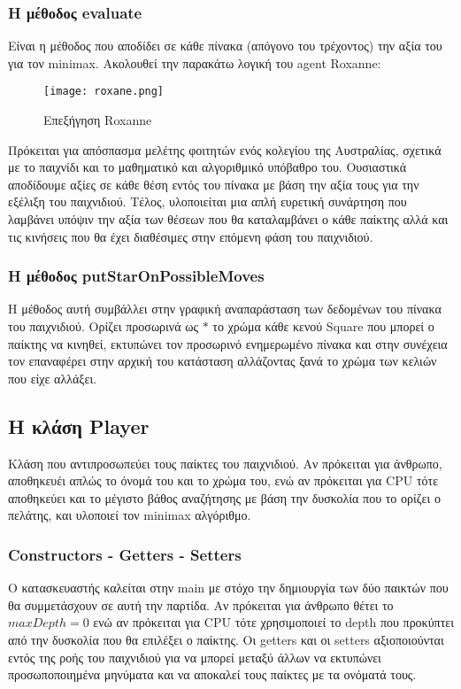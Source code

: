 \documentclass[12pt]{article}
\begin{document}
        \subsubsection{Η μέθοδος evaluate}
        Είναι η μέθοδος που αποδίδει σε κάθε πίνακα (απόγονο του τρέχοντος) την αξία του για τον minimax. Ακολουθεί την παρακάτω λογική του agent Roxanne:
        \begin{figure}[H]
            \centering
            \texttt{[image: roxane.png]}
            \caption{Επεξήγηση Roxanne}
        \end{figure}
        Πρόκειται για απόσπασμα μελέτης φοιτητών ενός κολεγίου της Αυστραλίας, σχετικά με το παιχνίδι και το μαθηματικό και αλγοριθμικό υπόβαθρο του. Ουσιαστικά αποδίδουμε αξίες σε κάθε θέση εντός του πίνακα με βάση την αξία τους για την εξέλιξη του παιχνιδιού. Τέλος, υλοποιείται μια απλή ευρετική συνάρτηση που λαμβάνει υπόψιν την αξία των θέσεων που θα καταλαμβάνει ο κάθε παίκτης αλλά και τις κινήσεις που θα έχει διαθέσιμες στην επόμενη φάση του παιχνιδιού. 
        \subsubsection{Η μέθοδος putStarOnPossibleMoves}
        Η μέθοδος αυτή συμβάλλει στην γραφική αναπαράσταση των δεδομένων του πίνακα του παιχνιδιού. Ορίζει προσωρινά ως $\ast$ το χρώμα κάθε κενού Square που μπορεί ο παίκτης να κινηθεί, εκτυπώνει τον προσωρινό ενημερωμένο πίνακα και στην συνέχεια τον επαναφέρει στην αρχική του κατάσταση αλλάζοντας ξανά το χρώμα των κελιών που είχε αλλάξει. 
    \subsection{Η κλάση Player}
    Κλάση που αντιπροσωπεύει τους παίκτες του παιχνιδιού. Αν πρόκειται για άνθρωπο, αποθηκευέι απλώς το όνομά του και το χρώμα του, ενώ αν πρόκειται για CPU τότε αποθηκεύει και το μέγιστο βάθος αναζήτησης με βάση την δυσκολία που το ορίζει ο πελάτης, και υλοποιεί τον minimax αλγόριθμο.
        \subsubsection{Constructors - Getters - Setters}
        Ο κατασκευαστής καλείται στην main με στόχο την δημιουργία των δύο παικτών που θα συμμετάσχουν σε αυτή την παρτίδα. Αν πρόκειται για άνθρωπο θέτει το $maxDepth = 0$ ενώ αν πρόκειται για CPU τότε χρησιμοποιεί το depth που προκύπτει από την δυσκολία που θα επιλέξει ο παίκτης. Οι getters και οι setters αξιοποιούνται εντός της ροής του παιχνιδιού για να μπορεί μεταξύ άλλων να εκτυπώνει προσωποποιημένα μηνύματα και να αποκαλεί τους παίκτες με τα ονόματά τους. 
\end{document}
